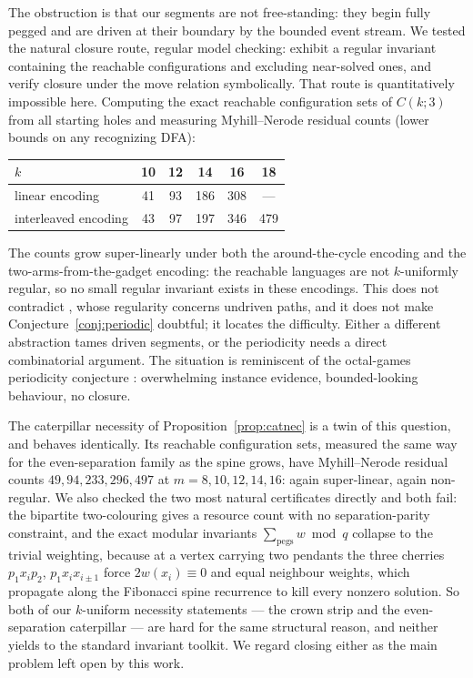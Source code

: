 \documentclass[11pt]{article}
\theoremstyle{definition}
\begin{document}
The obstruction is that our segments are not free-standing: they
begin fully pegged and are driven at their boundary by the bounded
event stream. We tested the natural closure route, regular model
checking: exhibit a regular invariant containing the reachable
configurations and excluding near-solved ones, and verify closure
under the move relation symbolically. That route is quantitatively
impossible here. Computing the exact reachable configuration sets of
$C(k;3)$ from all starting holes and measuring Myhill--Nerode
residual counts (lower bounds on any recognizing DFA):

\begin{center}\small
\begin{tabular}{lccccc}
\toprule
$k$ & 10 & 12 & 14 & 16 & 18\\
\midrule
linear encoding & 41 & 93 & 186 & 308 & ---\\
interleaved encoding & 43 & 97 & 197 & 346 & 479\\
\bottomrule
\end{tabular}
\end{center}

The counts grow super-linearly under both the around-the-cycle
encoding and the two-arms-from-the-gadget encoding: the reachable
languages are not $k$-uniformly regular, so no small regular
invariant exists in these encodings. This does not contradict
\cite{ME}, whose regularity concerns undriven paths, and it does not
make Conjecture~\ref{conj:periodic} doubtful; it locates the
difficulty. Either a different abstraction tames driven segments, or
the periodicity needs a direct combinatorial argument. The situation
is reminiscent of the octal-games periodicity conjecture
\cite{GuyNowakowski}: overwhelming instance evidence, bounded-looking
behaviour, no closure.

The caterpillar necessity of Proposition~\ref{prop:catnec} is a twin
of this question, and behaves identically. Its reachable
configuration sets, measured the same way for the even-separation
family as the spine grows, have Myhill--Nerode residual counts
$49, 94, 233, 296, 497$ at $m=8,10,12,14,16$: again super-linear,
again non-regular. We also checked the two most natural certificates
directly and both fail: the bipartite two-colouring gives a resource
count with no separation-parity constraint, and the exact modular
invariants $\sum_{\mathrm{pegs}} w \bmod q$ collapse to the trivial
weighting, because at a vertex carrying two pendants the three
cherries $p_1 x_i p_2$, $p_1 x_i x_{i\pm1}$ force $2w(x_i)\equiv 0$
and equal neighbour weights, which propagate along the Fibonacci
spine recurrence to kill every nonzero solution. So both of our
$k$-uniform necessity statements --- the crown strip and the
even-separation caterpillar --- are hard for the same structural
reason, and neither yields to the standard invariant toolkit. We
regard closing either as the main problem left open by this work.
\end{document}

